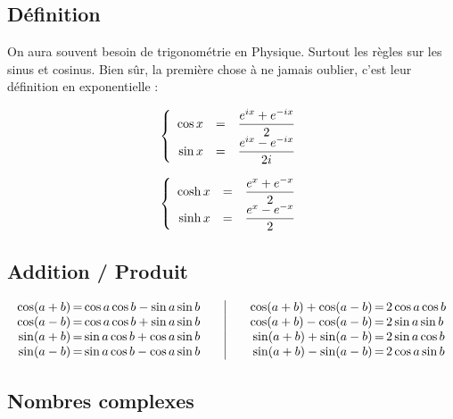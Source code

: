 \documentclass[11pt,a4paper,fleqn,pdftex]{report}
\begin{document}
\subsection{Définition}
On aura souvent besoin de trigonométrie en Physique. Surtout les règles sur les sinus et cosinus. Bien sûr, la première chose à ne jamais oublier, c'est leur définition en exponentielle : \\
%
\begin{minipage}{7cm}
\begin{equation}\label{def:cos}
\left\lbrace
\begin{array}{r c l}
\cos{x}&=&\dfrac{e^{ix}+e^{-ix}}{2}\\
\sin{x}&=&\dfrac{e^{ix}-e^{-ix}}{2i}\\
\end{array}
\right.
\end{equation}
\end{minipage}
\begin{minipage}{7cm}
\begin{equation}\label{def:cosh}
\left\lbrace
\begin{array}{r c l}
\cosh{x}&=&\dfrac{e^{x}+e^{-x}}{2}\\
\sinh{x}&=&\dfrac{e^{x}-e^{-x}}{2}\\
\end{array}
\right.
\end{equation}
\end{minipage}
%
\subsection{Addition / Produit}
\begin{equation}\label{trigo}
\begin{array}{r@{\, = \,}l @{\qquad}|@{\qquad} r@{\, = \,}l}
\cos (a+b) & \cos a \cos b - \sin a \sin b 
    & \cos (a+b) + \cos (a-b) & 2 \cos a \cos b \\
\cos (a-b) & \cos a \cos b + \sin a \sin b 
    & \cos (a+b) - \cos (a-b) & 2 \sin a \sin b \\
\sin (a+b) & \sin a \cos b + \cos a \sin b 
    & \sin (a+b) + \sin (a-b) & 2 \sin a \cos b \\
\sin (a-b) & \sin a \cos b - \cos a \sin b 
    & \sin (a+b) - \sin (a-b) & 2 \cos a \sin b
\end{array}
\end{equation}
%
\subsection{Nombres complexes} %
\label{sub:nombres_complexes}
\end{document}
